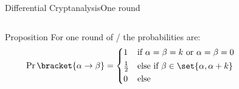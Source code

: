 \begin{frame}{Differential Cryptanalysis}{One round}
    \vspace{-30pt}
    \begin{columns}
        \begin{column}{0.58\textwidth}
            \centering
            \vspace{30pt}
            \begin{block}{Proposition}
                For one round of \bison/
                the probabilities are:
                \begin{equation*}
                    \Prob\bracket{\alpha \to \beta} = \begin{cases*}
                        1           & if $\alpha = \beta = k$ or $\alpha = \beta = 0$\\
                        \frac{1}{2} & else if $\beta \in \set{\alpha, \alpha + k}$\\
                        0           & else
                    \end{cases*}
                \end{equation*}
            \end{block}
        \end{column}
        \begin{column}{0.40\textwidth}
            \vspace{40pt}
            \centering
            \vfill
            \vfill
        \end{column}
    \end{columns}
\end{frame}

